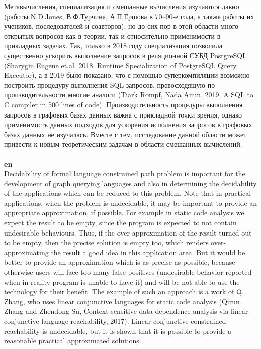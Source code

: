 \documentclass[12pt]{article}  %
\theoremstyle{remark}
\begin{document}
Метавычисления, специализация и смешанные вычисления изучаются давно (работы N.D.Jones, В.Ф.Турчина, А.П.Ершова в 70--90-е года, а также работы их учеников, последователей и соавторов), но до сих пор в этой области много открытых вопросов как в теории, так и относительно применимости в прикладных задачах.
Так, только в 2018 году специализация позволила существенно ускорить выполнение запросов в реляционной СУБД PostgreSQL (Sharygin Eugene et.al. 2018. Runtime Specialization of PostgreSQL Query Executor), а в 2019 было показано, что с помощью суперкомпиляции возможно построить процедуру выполнения SQL-запросов, превосходящую по производительности многие аналоги (Tiark Rompf, Nada Amin. 2019. A SQL to C compiler in 500 lines of code).
Производительность процедуры выполнения запросов в графовых базах данных важна с прикладной точки зрения, однако применимость данных подходов для ускорения исполнения запросов в графовых базах данных не изучалась.
Вместе с тем, исследование данной области может привести к новым теоретическим задачам в области смешанных вычислений.
\\
\\
\textbf{en}\\
Decidability of formal language constrained path problem is important for the development of graph querying languages and also in determining the decidability of the applications which can be reduced to this problem.
Note that in practical applications, when the problem is undecidable, it may be important to provide an appropriate approximation, if possible.
For example in static code analysis we expect the result to be empty, since the program is expected to not contain undesirable behaviours. 
Thus, if the over-approximation of the result turned out to be empty, then the precise solution is empty too, which renders over-approximating the result a good idea in this application area. 
But it would be better to provide an approximation which is as precise as possible, because otherwise users will face too many false-positives (undesirable behavior reported when in reality program is unable to have it) and will be not able to use the technology for their benefit. 
The example of such an approach is a work of Q. Zhang, who uses linear conjunctive languages for static code analysis (Qirun Zhang and Zhendong Su, Context-sensitive data-dependence analysis via linear conjunctive language reachability, 2017).
Linear conjunctive constrained reachability is undecidable, but it is shown that it is possible to provide a reasonable practical approximated solutions.
\end{document}
